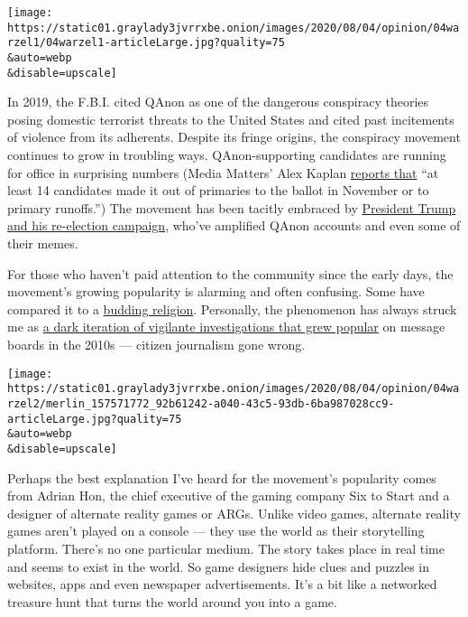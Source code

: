 \texttt{[image: https://static01.graylady3jvrrxbe.onion/images/2020/08/04/opinion/04warzel1/04warzel1-articleLarge.jpg?quality=75\\\&auto=webp\\\&disable=upscale]}

In 2019, the F.B.I. cited QAnon as one of the dangerous conspiracy
theories posing domestic terrorist threats to the United States and
cited past incitements of violence from its adherents. Despite its
fringe origins, the conspiracy movement continues to grow in troubling
ways. QAnon-supporting candidates are running for office in surprising
numbers (Media Matters' Alex Kaplan
\href{https://www.mediamatters.org/qanon-conspiracy-theory/qanon-may-be-coming-congress-and-journalists-need-be-ready}{reports
that} ``at least 14 candidates made it out of primaries to the ballot in
November or to primary runoffs.'') The movement has been tacitly
embraced by
\href{https://www.washingtonpost.com/politics/how-the-trump-campaign-came-to-court-qanon-the-online-conspiracy-movement-identified-by-the-fbi-as-a-violent-threat/2020/08/01/dd0ea9b4-d1d4-11ea-9038-af089b63ac21_story.html?utm_campaign=wp_politics_am\&utm_medium=email\&utm_source=newsletter\&wpisrc=nl_politics}{President
Trump and his re-election campaign}, who've amplified QAnon accounts and
even some of their memes.

For those who haven't paid attention to the community since the early
days, the movement's growing popularity is alarming and often confusing.
Some have compared it to a
\href{https://www.theatlantic.com/magazine/archive/2020/06/qanon-nothing-can-stop-what-is-coming/610567/}{budding
religion}. Personally, the phenomenon has always struck me as
\href{https://www.buzzfeednews.com/article/charliewarzel/behind-the-alarming-rise-of-the-online-vigilante-detective}{a
dark iteration of vigilante investigations that grew popular} on message
boards in the 2010s --- citizen journalism gone wrong.

\texttt{[image: https://static01.graylady3jvrrxbe.onion/images/2020/08/04/opinion/04warzel2/merlin\_157571772\_92b61242-a040-43c5-93db-6ba987028cc9-articleLarge.jpg?quality=75\\\&auto=webp\\\&disable=upscale]}

Perhaps the best explanation I've heard for the movement's popularity
comes from Adrian Hon, the chief executive of the gaming company Six to
Start and a designer of alternate reality games or ARGs. Unlike video
games, alternate reality games aren't played on a console --- they use
the world as their storytelling platform. There's no one particular
medium. The story takes place in real time and seems to exist in the
world. So game designers hide clues and puzzles in websites, apps and
even newspaper advertisements. It's a bit like a networked treasure hunt
that turns the world around you into a game.


